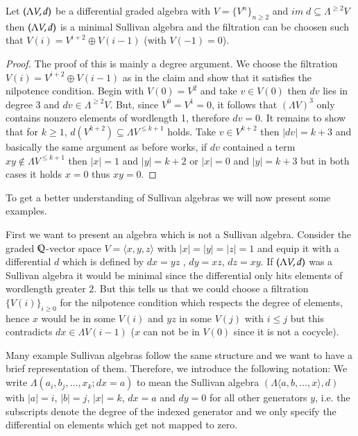 \begin{Proposition}
\label{prop:WellBehavedFiltrations}
 Let $(\Lambda V,d)$ be a differential graded algebra with $V = {\lbrace V^n \rbrace}_{n \geq 2}$ and 
 ${im \;d \subseteq \Lambda^{\geq 2} V}$ then $(\Lambda V,d)$ is a minimal Sullivan algebra and
 the filtration can be choosen such that $V(i) = V^{i+2} \oplus V(i-1)$ (with $V(-1) = 0$).
\end{Proposition}
\begin{proof}
 The proof of this is mainly a degree argument. We choose the filtration ${V(i) = V^{i+2} \oplus V(i-1)}$ as in the claim
 and show that it satisfies
 the nilpotence condition. Begin with $V(0) = V^2$ and take $v \in V(0)$ then $dv$ lies in
 degree $3$ and $dv \in \Lambda^{\geq 2} V$. But, since $V^0 = V^1 = 0$, it follows that $(\Lambda V)^3$ only contains 
 nonzero elements of wordlength 1, therefore $dv = 0$. 
 It remains to show that for $k \geq 1$, $d(V^{k+2}) \subseteq \Lambda V^{ \leq k+1}$ holds. Take $v \in V^{ k+2}$ then 
 $| dv | = k + 3$ and basically the same argument as before works, if $dv$ contained a term $xy \notin \Lambda V^{\leq k+1}$
 then $|x| = 1$ and $|y| = k + 2$ or $|x| = 0$ and $|y| = k + 3$ but in both cases it holds $x = 0$ thus $xy = 0$.
\end{proof}

To get a better understanding of Sullivan algebras we will now present some examples.

\begin{Example}
 First we want to present an algebra which is not a Sullivan algebra. 
 Consider the graded $\mathbb{Q}$-vector space $V = \langle x,y,z \rangle$ with $|x| = |y| = |z| = 1$ and 
 equip it with a differential $d$ which is defined by $dx = yz$ , $dy = xz$, $dz = xy$. \newline
 If $(\Lambda V,d)$ was a Sullivan algebra it would be minimal since 
 the differential only hits elements of wordlength greater $2$. But this tells us that we could choose a filtration 
 ${\lbrace V(i) \rbrace}_{i \geq 0}$ for
 the nilpotence condition which respects the degree of elements, hence $ x $ would be in some $V(i)$ and $yz$ in some $V(j)$
 with $i \leq j$ but this contradicts $dx \in \Lambda V(i-1)$ ($x$ can not be in $V(0)$ since it is not a cocycle).
 \end{Example}

\begin{Remark}
 Many example Sullivan algebras follow the same structure and we want to have a brief representation of them.
 Therefore, we introduce the following notation: \newline
 We write $\Lambda (a_i , b_j, \ldots, x_k ; d x = a)$ to mean the Sullivan algebra
 $(\Lambda \langle a, b, \ldots, x \rangle , d) $ with $|a| = i$, $|b| = j$, $|x| = k$, $d x = a$ and
 $dy = 0 $ for all other generators $y$, i.e. the subscripts denote the degree of the indexed generator and
 we only specify the differential on elements which get not mapped to zero.
\end{Remark}




